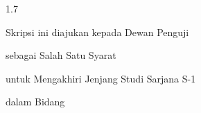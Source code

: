\newpage
{}
{}
\begin{spacing}{1.7}
\bfseries
\begin{center}
\thesiscoverhead
\vfill
{\fontsize{11pt}{13pt}\selectfont
Skripsi ini diajukan kepada Dewan Penguji\par
\facultyname{} \institutionname\par
sebagai Salah Satu Syarat\par
untuk Mengakhiri Jenjang Studi Sarjana S-1\par
dalam Bidang \departmentname\par
\academicyear\par}
\end{center}
\end{spacing}
